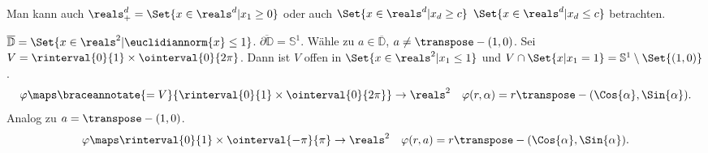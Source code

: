 \begin{bemerkung*}
  Man kann auch \( \reals_{+}^d=\Set{x\in \reals^d|x_1\geq 0} \) oder auch \( \Set{x\in \reals^d|x_d\geq c} \) \bzw \( \Set{x\in \reals^d|x_d\leq c} \) betrachten.
\end{bemerkung*}
\begin{beispiel*}
  \( \overline{\mathbb{D}}=\Set{x\in \reals^2| \euclidiannorm{x}\leq 1} \). \( \overline{\partial \mathbb{D}}=\mathbb{S}^1 \). Wähle zu \( a\in \overline{\mathbb{D}} \), \( a\neq \transpose-{(1,0)} \). Sei \( V=\rinterval{0}{1}\times \ointerval{0}{2\pi} \). Dann ist \( V \) offen in \( \Set{x\in \reals^2|x_1\leq 1} \) und \( V\cap \Set{x|x_1=1}=\mathbb{S}^1\setminus \Set{(1,0)} \).
  \begin{equation*}
    \varphi\maps \braceannotate{=V}{\rinterval{0}{1}\times \ointerval{0}{2\pi}}\to \reals^2\quad \varphi(r,\alpha)=r\transpose-{(\Cos{\alpha},\Sin{\alpha})}.
  \end{equation*}
  Analog zu \( a=\transpose-{(1,0)} \).
  \begin{gather*}
    \varphi\maps \rinterval{0}{1}\times \ointerval{-\pi}{\pi}\to \reals^2\quad \varphi(r,a)=r\transpose-{(\Cos{\alpha},\Sin{\alpha})}.
  \end{gather*}
\end{beispiel*}
